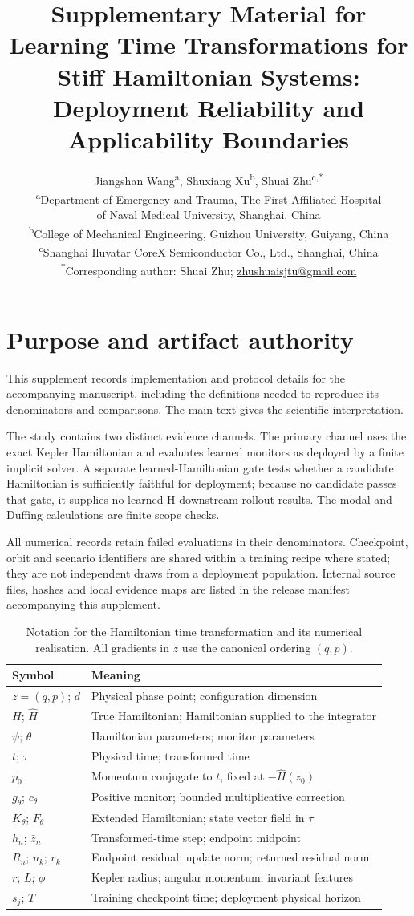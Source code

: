 \documentclass[11pt]{article}
\title{Supplementary Material for\\
Learning Time Transformations for Stiff Hamiltonian Systems:\\
Deployment Reliability and Applicability Boundaries}
\author{\begin{tabular}{c}
Jiangshan Wang\textsuperscript{a}, Shuxiang Xu\textsuperscript{b},
Shuai Zhu\textsuperscript{c,*}\\[0.5em]
\small\textsuperscript{a}Department of Emergency and Trauma, The First Affiliated Hospital\\
\small of Naval Medical University, Shanghai, China\\
\small\textsuperscript{b}College of Mechanical Engineering, Guizhou University, Guiyang, China\\
\small\textsuperscript{c}Shanghai Iluvatar CoreX Semiconductor Co., Ltd., Shanghai, China\\[0.5em]
\small\textsuperscript{*}Corresponding author: Shuai Zhu;
\href{mailto:zhushuaisjtu@gmail.com}{\small zhushuaisjtu@gmail.com}
\end{tabular}}
\date{}
\begin{document}
\maketitle
\tableofcontents

\section{Purpose and artifact authority}

This supplement records implementation and protocol details for the
accompanying manuscript, including the definitions needed to reproduce
its denominators and comparisons. The main text gives the scientific
interpretation.

The study contains two distinct evidence channels. The primary channel uses
the exact Kepler Hamiltonian and evaluates learned monitors as deployed by a
finite implicit solver. A separate learned-Hamiltonian gate tests whether a
candidate Hamiltonian is sufficiently faithful for deployment; because no
candidate passes that gate, it supplies no learned-H downstream rollout
results. The modal and Duffing calculations are finite scope checks.

All numerical records retain failed evaluations in their denominators.
Checkpoint, orbit and scenario identifiers are shared within a training
recipe where stated; they are not independent draws from a deployment
population. Internal source files, hashes and local evidence maps are listed
in the release manifest accompanying this supplement.

\begin{table}[ht]
\centering\small
\caption{Notation for the Hamiltonian time transformation and its numerical
realisation. All gradients in $z$ use the canonical ordering $(q,p)$.}
\label{tab:notation}
\begin{tabular}{@{}ll@{}}
\toprule
Symbol & Meaning \\
\midrule
$z=(q,p)$; $d$ & Physical phase point; configuration dimension \\
$H$; $\widehat H$ & True Hamiltonian; Hamiltonian supplied to the integrator \\
$\psi$; $\theta$ & Hamiltonian parameters; monitor parameters \\
$t$; $\tau$ & Physical time; transformed time \\
$p_0$ & Momentum conjugate to $t$, fixed at $-\widehat H(z_0)$ \\
$g_\theta$; $c_\theta$ & Positive monitor; bounded multiplicative correction \\
$K_\theta$; $F_\theta$ & Extended Hamiltonian; state vector field in $\tau$ \\
$h_n$; $\bar z_n$ & Transformed-time step; endpoint midpoint \\
$R_n$; $u_k$; $r_k$ & Endpoint residual; update norm; returned residual norm \\
$r$; $L$; $\phi$ & Kepler radius; angular momentum; invariant features \\
$s_j$; $T$ & Training checkpoint time; deployment physical horizon \\
\bottomrule
\end{tabular}
\end{table}
\end{document}
